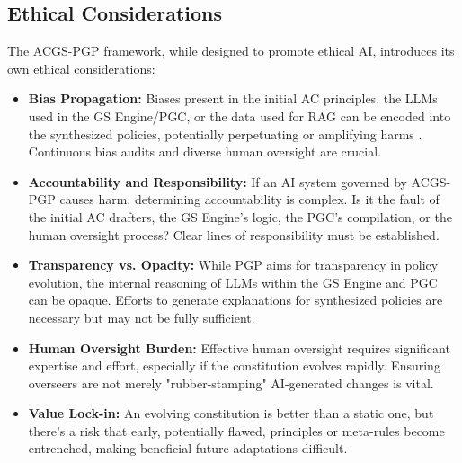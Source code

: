 \documentclass[sigconf,review,screen]{acmart}
\begin{document}
\subsection{Ethical Considerations}
The ACGS-PGP framework, while designed to promote ethical AI, introduces its own ethical considerations:
\begin{itemize}
    \item \textbf{Bias Propagation:} Biases present in the initial AC principles, the LLMs used in the GS Engine/PGC, or the data used for RAG can be encoded into the synthesized policies, potentially perpetuating or amplifying harms \cite{bender2021dangers}. Continuous bias audits and diverse human oversight are crucial.
    \item \textbf{Accountability and Responsibility:} If an AI system governed by ACGS-PGP causes harm, determining accountability is complex. Is it the fault of the initial AC drafters, the GS Engine's logic, the PGC's compilation, or the human oversight process? Clear lines of responsibility must be established.
    \item \textbf{Transparency vs. Opacity:} While PGP aims for transparency in policy evolution, the internal reasoning of LLMs within the GS Engine and PGC can be opaque. Efforts to generate explanations for synthesized policies are necessary but may not be fully sufficient.
    \item \textbf{Human Oversight Burden:} Effective human oversight requires significant expertise and effort, especially if the constitution evolves rapidly. Ensuring overseers are not merely "rubber-stamping" AI-generated changes is vital.
    \item \textbf{Value Lock-in:} An evolving constitution is better than a static one, but there's a risk that early, potentially flawed, principles or meta-rules become entrenched, making beneficial future adaptations difficult.
\end{itemize}
\end{document}
